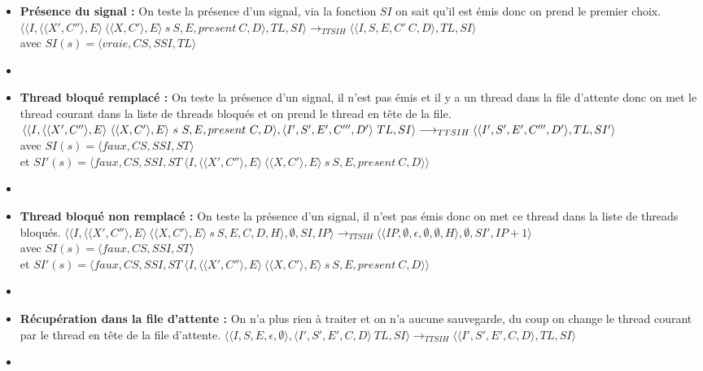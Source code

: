 \documentclass[10pt,a4paper]{report}
\begin{document}
\begin{enumerate}
\begin{itemize}
			\item[] \textbf{Présence du signal :} On teste la présence d'un signal, via la fonction $SI$ on sait qu'il est émis donc on prend le premier choix.
			\smallbreak
			$\langle\langle I,\langle\langle X',C''\rangle,E\rangle~\langle\langle X,C'\rangle,E\rangle~s~S,E,present~C,D\rangle,TL,SI\rangle 
			\longrightarrow_{TTSIH} 
			\langle\langle I,S,E,C'~C,D\rangle,TL,SI\rangle$ 
			\\avec $SI(s) = \langle vraie,CS,SSI,TL\rangle$
			\item[] \newpage
			
			
			
			
			\item[] \textbf{ Thread bloqué remplacé :} On teste la présence d'un signal, il n'est pas émis et il y a un thread dans la file d'attente donc on met le thread courant dans la liste de threads bloqués et on prend le thread en tête de la file.
			\smallbreak
			$\langle\langle I,\langle\langle X',C''\rangle,E\rangle~\langle\langle X,C'\rangle,E\rangle~s~S,E,present~C,D\rangle,\langle I',S',E',C''',D'\rangle~TL,SI\rangle 
			\\\longrightarrow_{TTSIH} 
			\langle\langle I',S',E',C''',D'\rangle,TL,SI'\rangle$ 
			\\avec $SI(s) = \langle faux,CS,SSI,ST\rangle$
			\\et $SI'(s) = \langle faux,CS,SSI,ST~\langle I,\langle\langle X',C''\rangle,E\rangle~\langle\langle X,C'\rangle,E\rangle~s~S,E,present~C,D\rangle\rangle$
			\item[]	
			
			\item[] \textbf{Thread bloqué non remplacé :} On teste la présence d'un signal, il n'est pas émis donc on met ce thread dans la liste de threads bloqués.
			\smallbreak 
			$\langle\langle I,\langle\langle X',C''\rangle,E\rangle~\langle\langle X,C'\rangle,E\rangle~s~S,E,C,D,H\rangle,\emptyset,SI,IP\rangle 
			\longrightarrow_{TTSIH} 
			\langle\langle IP,\emptyset,\epsilon,\emptyset,\emptyset,H\rangle,\emptyset,SI',IP+1\rangle$
			\\avec $SI(s) = \langle faux,CS,SSI,ST\rangle$
			\\et $SI'(s) = \langle faux,CS,SSI,ST~\langle I,\langle\langle X',C''\rangle,E\rangle~\langle\langle X,C'\rangle,E\rangle~s~S,E,present~C,D\rangle\rangle$
			\item[]
			
			\item[] \textbf{Récupération dans la file d'attente :} On n'a plus rien à traiter et on n'a aucune sauvegarde, du coup on change le thread courant par le thread en tête de la file d'attente.
			\smallbreak
			$\langle\langle I,S,E,\epsilon,\emptyset\rangle,\langle I',S',E',C,D\rangle~TL,SI\rangle 
			\longrightarrow_{TTSIH} 
			\langle\langle I',S',E',C,D\rangle,TL,SI\rangle$
			\item[]
			

\end{itemize}
\end{enumerate}
\end{document}
